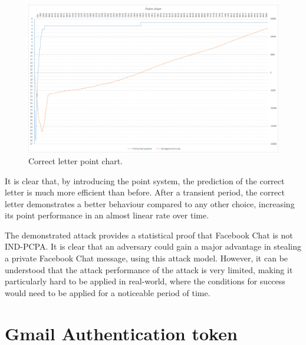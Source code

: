 \begin{figure}[H] \caption{Correct letter point chart.}
\includegraphics[width=1\textwidth]{diagrams/point_system_chart_2.png}\end{figure}

It is clear that, by introducing the point system, the prediction of the correct
letter is much more efficient than before. After a transient period, the correct
letter demonstrates a better behaviour compared to any other choice, increasing
its point performance in an almost linear rate over time.

The demonstrated attack provides a statistical proof that Facebook Chat is not
IND-PCPA. It is clear that an adversary could gain a major advantage in stealing a
private Facebook Chat message, using this attack model. However, it can be
understood that the attack performance of the attack is very limited, making it
particularly hard to be applied in real-world, where the conditions for success
would need to be applied for a noticeable period of time.

\section{Gmail Authentication token}\label{sec:gmail_experiment}



